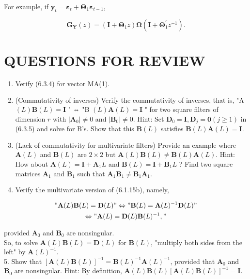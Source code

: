 \documentclass[10pt]{article}
\begin{document}
For example, if $\mathbf{y}_{t}=\boldsymbol{\varepsilon}_{t}+\boldsymbol{\Theta}_{1} \boldsymbol{\varepsilon}_{t-1}$,

$$
\mathbf{G}_{\mathbf{Y}}(z)=\left(\mathbf{I}+\boldsymbol{\Theta}_{1} z\right) \boldsymbol{\Omega}\left(\mathbf{I}+\boldsymbol{\Theta}_{1}^{\prime} z^{-1}\right) .
$$

\section*{QUESTIONS FOR REVIEW}
\begin{enumerate}
  \item Verify (6.3.4) for vector MA(1).
  \item (Commutativity of inverses) Verify the commutativity of inverses, that is, "A $(L) \mathbf{B}(L)=\mathbf{I}$ " ⇔ "B $(L) \mathbf{A}(L)=\mathbf{I}$ " for two square filters of dimension $r$ with $\left|\mathbf{A}_{0}\right| \neq 0$ and $\left|\mathbf{B}_{0}\right| \neq 0$. Hint: Set $\mathbf{D}_{0}=\mathbf{I}, \mathbf{D}_{j}=\mathbf{0}(j \geq 1)$ in (6.3.5) and solve for B's. Show that this $\mathbf{B}(L)$ satisfies $\mathbf{B}(L) \mathbf{A}(L)=\mathbf{I}$.
  \item (Lack of commutativity for multivariate filters) Provide an example where $\mathbf{A}(L)$ and $\mathbf{B}(L)$ are $2 \times 2$ but $\mathbf{A}(L) \mathbf{B}(L) \neq \mathbf{B}(L) \mathbf{A}(L)$. Hint: How about $\mathbf{A}(L)=\mathbf{I}+\mathbf{A}_{1} L$ and $\mathbf{B}(L)=\mathbf{I}+\mathbf{B}_{1} L$ ? Find two square matrices $\mathbf{A}_{1}$ and $\mathbf{B}_{1}$ such that $\mathbf{A}_{1} \mathbf{B}_{1} \neq \mathbf{B}_{1} \mathbf{A}_{1}$.
  \item Verify the multivariate version of (6.1.15b), namely,
\end{enumerate}

$$
\begin{gathered}
" \mathbf{A}(L) \mathbf{B}(L)=\mathbf{D}(L) " \Leftrightarrow " \mathbf{B}(L)=\mathbf{A}(L)^{-1} \mathbf{D}(L) " \\
\Leftrightarrow " \mathbf{A}(L)=\mathbf{D}(L) \mathbf{B}(L)^{-1}, "
\end{gathered}
$$

provided $\mathbf{A}_{0}$ and $\mathbf{B}_{0}$ are nonsingular.\\
So, to solve $\mathbf{A}(L) \mathbf{B}(L)=\mathbf{D}(L)$ for $\mathbf{B}(L)$, "multiply both sides from the left" by $\mathbf{A}(L)^{-1}$.\\
5. Show that $[\mathbf{A}(L) \mathbf{B}(L)]^{-1}=\mathbf{B}(L)^{-1} \mathbf{A}(L)^{-1}$, provided that $\mathbf{A}_{0}$ and $\mathbf{B}_{0}$ are nonsingular. Hint: By definition, $\mathbf{A}(L) \mathbf{B}(L)[\mathbf{A}(L) \mathbf{B}(L)]^{-1}=\mathbf{I}$.
\end{document}
